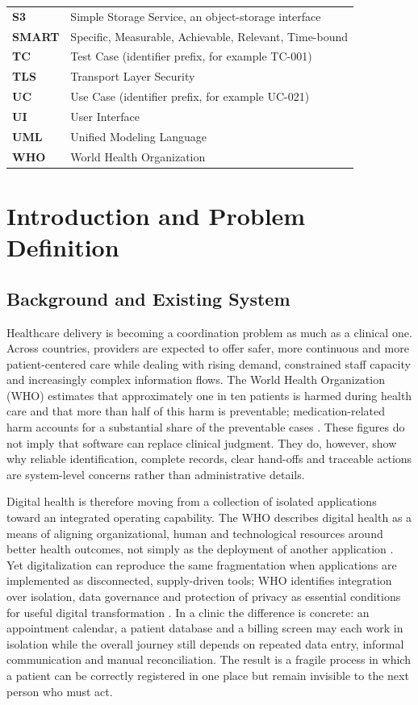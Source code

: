 \documentclass[a4paper,12pt]{article}
\begin{document}
\begin{longtable}{@{}>{\bfseries}p{}p{}@{}}
S3 & Simple Storage Service, an object-storage interface \\
SMART & Specific, Measurable, Achievable, Relevant, Time-bound \\
TC & Test Case (identifier prefix, for example TC-001) \\
TLS & Transport Layer Security \\
UC & Use Case (identifier prefix, for example UC-021) \\
UI & User Interface \\
UML & Unified Modeling Language \\
WHO & World Health Organization \\
\bottomrule
\end{longtable}
\endgroup
\clearpage


\section{Introduction and Problem Definition}

\subsection{Background and Existing System}
Healthcare delivery is becoming a coordination problem as much as a clinical one. Across countries, providers are expected to offer safer, more continuous and more patient-centered care while dealing with rising demand, constrained staff capacity and increasingly complex information flows. The World Health Organization (WHO) estimates that approximately one in ten patients is harmed during health care and that more than half of this harm is preventable; medication-related harm accounts for a substantial share of the preventable cases \citep{WHO2023Safety}. These figures do not imply that software can replace clinical judgment. They do, however, show why reliable identification, complete records, clear hand-offs and traceable actions are system-level concerns rather than administrative details.

Digital health is therefore moving from a collection of isolated applications toward an integrated operating capability. The WHO describes digital health as a means of aligning organizational, human and technological resources around better health outcomes, not simply as the deployment of another application \citep{WHO2021Digital}. Yet digitalization can reproduce the same fragmentation when applications are implemented as disconnected, supply-driven tools; WHO identifies integration over isolation, data governance and protection of privacy as essential conditions for useful digital transformation \citep{WHO2021DataGovernance,WHO2024DigitalTransformation}. In a clinic the difference is concrete: an appointment calendar, a patient database and a billing screen may each work in isolation while the overall journey still depends on repeated data entry, informal communication and manual reconciliation. The result is a fragile process in which a patient can be correctly registered in one place but remain invisible to the next person who must act.
\end{document}

